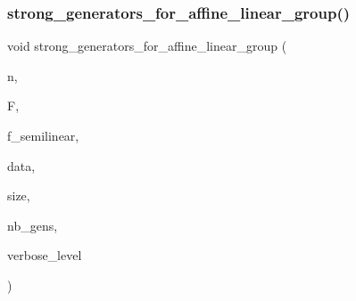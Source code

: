 \subsubsection{\texorpdfstring{strong\+\_\+generators\+\_\+for\+\_\+affine\+\_\+linear\+\_\+group()}{strong\_generators\_for\_affine\_linear\_group()}}
{\footnotesize\ttfamily void strong\+\_\+generators\+\_\+for\+\_\+affine\+\_\+linear\+\_\+group (\begin{DoxyParamCaption}\item[{\mbox{\hyperlink{galois_8h_a09fddde158a3a20bd2dcadb609de11dc}{I\+NT}}}]{n,  }\item[{\mbox{\hyperlink{classfinite__field}{finite\+\_\+field}} $\ast$}]{F,  }\item[{\mbox{\hyperlink{galois_8h_a09fddde158a3a20bd2dcadb609de11dc}{I\+NT}}}]{f\+\_\+semilinear,  }\item[{\mbox{\hyperlink{galois_8h_a09fddde158a3a20bd2dcadb609de11dc}{I\+NT}} $\ast$\&}]{data,  }\item[{\mbox{\hyperlink{galois_8h_a09fddde158a3a20bd2dcadb609de11dc}{I\+NT}} \&}]{size,  }\item[{\mbox{\hyperlink{galois_8h_a09fddde158a3a20bd2dcadb609de11dc}{I\+NT}} \&}]{nb\+\_\+gens,  }\item[{\mbox{\hyperlink{galois_8h_a09fddde158a3a20bd2dcadb609de11dc}{I\+NT}}}]{verbose\+\_\+level }\end{DoxyParamCaption})}

\mbox{\label{group__generators_8_c_afb75a881b423e6fce76c7f1e20fcb40e}} 
